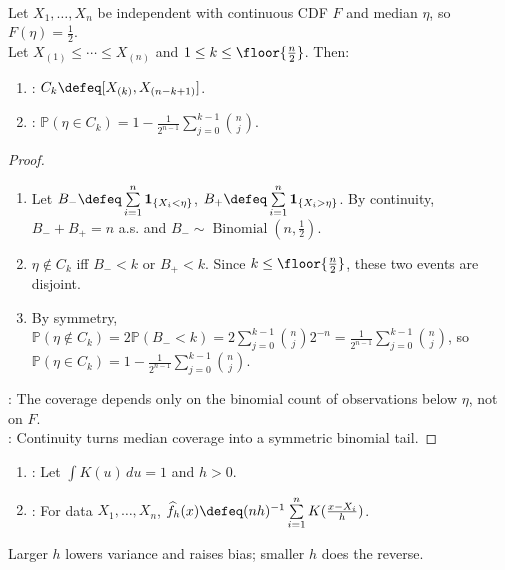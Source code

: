 \begin{proposition} \label{prop:distribution-free-median-confidence-interval} \\
Let $X_1,\ldots,X_n$ be independent with continuous CDF $F$ and median $\eta$, so $F(\eta)=\frac{1}{2}$.\\
Let $X_{(1)}\leq\cdots\leq X_{(n)}$ and $1\leq k\leq\floor{\frac{n}{2}}$. Then:
\begin{enumerate}[label=(\roman*)]
\setlength{\itemsep}{0pt}
\item {}: $C_k\defeq[X_{(k)},X_{(n-k+1)}]$.
\item {}: $\mathbb{P}(\eta\in C_k)=1-\frac{1}{2^{n-1}}\sum\limits_{j=0}^{k-1}\binom{n}{j}$.
\end{enumerate}
\begin{proof}
\begin{enumerate}[label=(\roman*)]
\setlength{\itemsep}{0pt}
\item Let $B_-\defeq\sum\limits_{i=1}^n\mathbf{1}_{\{X_i<\eta\}}$, $B_+\defeq\sum\limits_{i=1}^n\mathbf{1}_{\{X_i>\eta\}}$. By continuity, $B_-+B_+=n$ a.s. and $B_-\sim\operatorname{Binomial}(n,\frac{1}{2})$.
\item $\eta\notin C_k$ iff $B_-<k$ or $B_+<k$. Since $k\leq\floor{\frac{n}{2}}$, these two events are disjoint.
\item By symmetry, $\mathbb{P}(\eta\notin C_k)=2\mathbb{P}(B_-<k)=2\sum\limits_{j=0}^{k-1}\binom{n}{j}2^{-n}=\frac{1}{2^{n-1}}\sum\limits_{j=0}^{k-1}\binom{n}{j}$, so $\mathbb{P}(\eta\in C_k)=1-\frac{1}{2^{n-1}}\sum\limits_{j=0}^{k-1}\binom{n}{j}$.
\end{enumerate}
: The coverage depends only on the binomial count of observations below $\eta$, not on $F$.\\
: Continuity turns median coverage into a symmetric binomial tail.
\end{proof}
\end{proposition}

\begin{definition} \label{def:kernel-density-estimator} 
\begin{enumerate}[label=(\roman*)]
\setlength{\itemsep}{0pt}
\item {}: Let $\int K(u)\,du=1$ and $h>0$.
\item {}: For data $X_1,\ldots,X_n$, $\widehat{f}_h(x)\defeq(nh)^{-1}\sum\limits_{i=1}^nK(\frac{x-X_i}{h})$.
\end{enumerate}
Larger $h$ lowers variance and raises bias; smaller $h$ does the reverse.
\end{definition}

